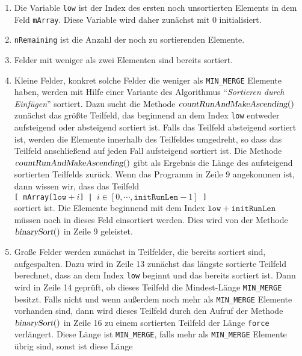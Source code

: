 \begin{enumerate}
\item Die Variable \texttt{low} ist der Index des ersten noch unsortierten Elements in dem Feld 
      \texttt{mArray}.  Diese Variable wird daher zun\"achst mit $0$ initialisiert.  
\item \texttt{nRemaining} ist die Anzahl der noch zu sortierenden Elemente.
\item Felder mit weniger als zwei Elementen sind bereits sortiert.
\item Kleine Felder, konkret solche Felder die weniger als \texttt{MIN\_MERGE} Elemente haben,
      werden mit Hilfe einer Variante des Algorithmus ``\emph{Sortieren durch Einf\"ugen}''
      sortiert.  Dazu sucht die Methode $\textsl{countRunAndMakeAscending}()$ zun\"achst das gr\"o{\ss}te
      Teilfeld, das beginnend an dem Index \texttt{low} entweder aufsteigend oder absteigend
      sortiert ist.  Falls das Teilfeld absteigend sortiert ist, werden die Elemente innerhalb
      des Teilfeldes umgedreht, so dass das Teilfeld anschlie{\ss}end auf jeden Fall aufsteigend
      sortiert ist.  Die Methode $\textsl{countRunAndMakeAscending}()$ gibt als Ergebnis die L\"ange
      des aufsteigend sortierten Teilfelds zur\"uck.  Wenn das Programm in Zeile 9 angekommen ist,
      dann wissen wir, dass das Teilfeld
      \\[0.2cm]
      \hspace*{1.3cm}
      \texttt{[ mArray[$\texttt{low} + i$] | $i \in [0, \cdots, \mathtt{initRunLen}-1]$ ]}
      \\[0.2cm]
      sortiert ist.  Die Elemente beginnend mit dem Index $\mathtt{low}+ \mathtt{initRunLen}$ m\"ussen
      noch in dieses Feld einsortiert werden.  
      Dies wird von der Methode $\textsl{binarySort}()$ in Zeile 9 geleistet.
\item Gro{\ss}e Felder werden zun\"achst in Teilfelder, die bereits sortiert sind, aufgespalten.
      Dazu wird in Zeile 13 zun\"achst das l\"angste sortierte Teilfeld berechnet, dass an dem Index 
      \texttt{low} beginnt und das bereits sortiert ist.  Dann wird in Zeile 14 gepr\"uft, 
      ob dieses Teilfeld die Mindest-L\"ange \texttt{MIN\_MERGE} besitzt.  Falls nicht und wenn
      au{\ss}erdem noch mehr als \texttt{MIN\_MERGE} Elemente vorhanden sind, dann wird dieses Teilfeld
      durch den Aufruf der Methode $\textsl{binarySort}()$ in Zeile 16 zu einem sortierten
      Teilfeld der L\"ange \texttt{force} verl\"angert.  Diese L\"ange ist \texttt{MIN\_MERGE},
      falls mehr als \texttt{MIN\_MERGE} Elemente \"ubrig sind, sonst ist diese L\"ange

\end{enumerate}

